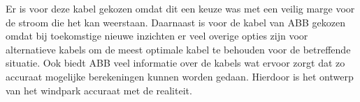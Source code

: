 Er is voor deze kabel gekozen omdat dit een keuze was met een veilig marge voor de stroom die het kan weerstaan. Daarnaast is voor de kabel van ABB gekozen omdat bij toekomstige nieuwe inzichten er veel overige opties zijn voor alternatieve kabels om de meest optimale kabel te behouden voor de betreffende situatie. Ook biedt ABB veel informatie over de kabels wat ervoor zorgt dat zo accuraat mogelijke berekeningen kunnen worden gedaan. Hierdoor is het ontwerp van het windpark accuraat met de realiteit. 